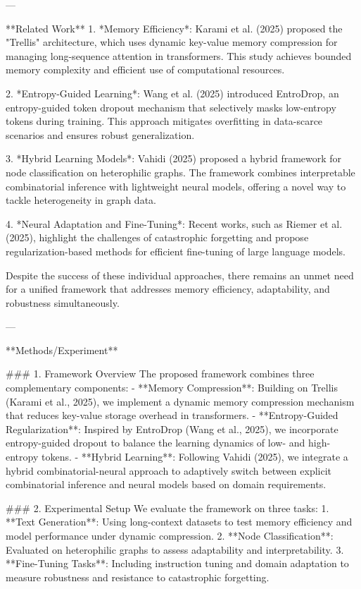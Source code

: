 ---

**Related Work**  
1. *Memory Efficiency*: Karami et al. (2025) proposed the "Trellis" architecture, which uses dynamic key-value memory compression for managing long-sequence attention in transformers. This study achieves bounded memory complexity and efficient use of computational resources.  

2. *Entropy-Guided Learning*: Wang et al. (2025) introduced EntroDrop, an entropy-guided token dropout mechanism that selectively masks low-entropy tokens during training. This approach mitigates overfitting in data-scarce scenarios and ensures robust generalization.  

3. *Hybrid Learning Models*: Vahidi (2025) proposed a hybrid framework for node classification on heterophilic graphs. The framework combines interpretable combinatorial inference with lightweight neural models, offering a novel way to tackle heterogeneity in graph data.  

4. *Neural Adaptation and Fine-Tuning*: Recent works, such as Riemer et al. (2025), highlight the challenges of catastrophic forgetting and propose regularization-based methods for efficient fine-tuning of large language models.  

Despite the success of these individual approaches, there remains an unmet need for a unified framework that addresses memory efficiency, adaptability, and robustness simultaneously.  

---

**Methods/Experiment**  

### 1. Framework Overview  
The proposed framework combines three complementary components:  
- **Memory Compression**: Building on Trellis (Karami et al., 2025), we implement a dynamic memory compression mechanism that reduces key-value storage overhead in transformers.  
- **Entropy-Guided Regularization**: Inspired by EntroDrop (Wang et al., 2025), we incorporate entropy-guided dropout to balance the learning dynamics of low- and high-entropy tokens.  
- **Hybrid Learning**: Following Vahidi (2025), we integrate a hybrid combinatorial-neural approach to adaptively switch between explicit combinatorial inference and neural models based on domain requirements.  

### 2. Experimental Setup  
We evaluate the framework on three tasks:  
1. **Text Generation**: Using long-context datasets to test memory efficiency and model performance under dynamic compression.  
2. **Node Classification**: Evaluated on heterophilic graphs to assess adaptability and interpretability.  
3. **Fine-Tuning Tasks**: Including instruction tuning and domain adaptation to measure robustness and resistance to catastrophic forgetting.  

